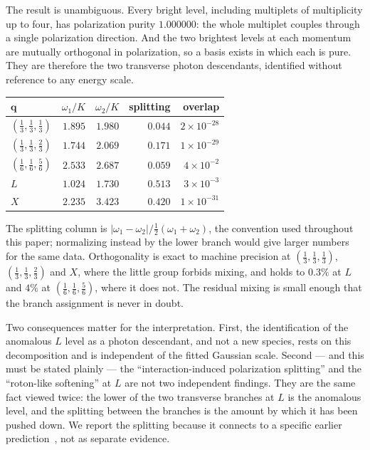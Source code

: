 \documentclass[aps,prl,twocolumn,amsmath,amssymb,superscriptaddress,
longbibliography,floatfix]{revtex4-2}
\newcommand{\bq}{\bm q}
\begin{document}
The result is unambiguous. Every bright level, including multiplets
of multiplicity up to four, has polarization purity $1.000000$: the
whole multiplet couples through a single polarization direction. And
the two brightest levels at each momentum are mutually orthogonal in
polarization, so a basis exists in which each is pure. They are
therefore the two transverse photon descendants, identified without
reference to any energy scale.

\begin{center}
\begin{tabular}{lrrrr}
\hline\hline
$\bq$ & $\omega_1/K$ & $\omega_2/K$ & splitting & overlap\\
\hline
$(\frac13,\frac13,\frac13)$ & $1.895$ & $1.980$ & $0.044$ & $2\times10^{-28}$\\
$(\frac13,\frac13,\frac23)$ & $1.744$ & $2.069$ & $0.171$ & $1\times10^{-29}$\\
$(\frac16,\frac16,\frac56)$ & $2.533$ & $2.687$ & $0.059$ & $4\times10^{-2}$\\
$L$                         & $1.024$ & $1.730$ & $0.513$ & $3\times10^{-3}$\\
$X$                         & $2.235$ & $3.423$ & $0.420$ & $1\times10^{-31}$\\
\hline\hline
\end{tabular}
\end{center}

The splitting column is
$|\omega_1-\omega_2|/\tfrac12(\omega_1+\omega_2)$, the convention used
throughout this paper; normalizing instead by the lower branch would
give larger numbers for the same data. Orthogonality is
exact to machine precision at $(\frac13,\frac13,\frac13)$,
$(\frac13,\frac13,\frac23)$ and $X$, where the little group forbids
mixing, and holds to $0.3\%$ at $L$ and $4\%$ at
$(\frac16,\frac16,\frac56)$, where it does not. The residual mixing
is small enough that the branch assignment is never in doubt.

Two consequences matter for the interpretation. First, the
identification of the anomalous $L$ level as a photon descendant, and
not a new species, rests on this decomposition and is independent of
the fitted Gaussian scale. Second --- and this must be stated
plainly --- the ``interaction-induced polarization splitting'' and the
``roton-like softening'' at $L$ are not two independent findings.
They are the same fact viewed twice: the lower of the two transverse
branches at $L$ is the anomalous level, and the splitting between the
branches is the amount by which it has been pushed down. We report
the splitting because it connects to a specific earlier
prediction~\cite{Kwasigroch2017,Kwasigroch2020}, not as separate
evidence.
\end{document}
